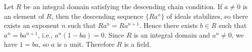 Let $R$ be an integral domain satisfying the descending chain condition. If $a \neq 0$ is an element of $R$, then the descending sequence $\{Ra^n\}$ of ideals stabilizes, so there exists an exponent $n$ such that $Ra^n = Ra^{n+1}$. Hence there exists $b \in R$ such that $a^n = ba^{n+1}$, i.e., $a^n(1 - ba) = 0$. Since $R$ is an integral domain and $a^n \neq 0$, we have $1 = ba$, so $a$ is a unit. Therefore $R$ is a field.
